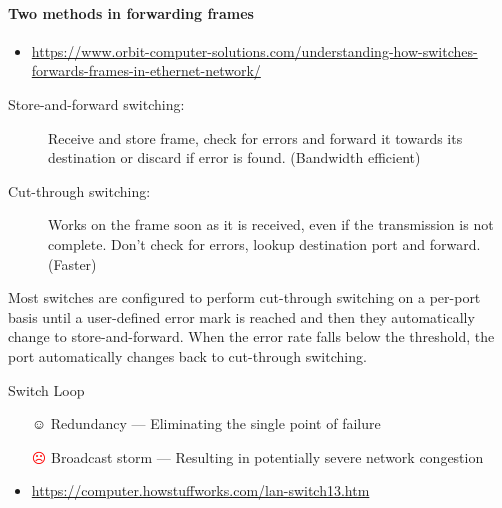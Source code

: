 \paragraph{Two methods in forwarding frames}
\begin{itemize}
\item \url{https://www.orbit-computer-solutions.com/understanding-how-switches-forwards-frames-in-ethernet-network/}
\end{itemize}
\begin{description}
\item[Store-and-forward switching:] Receive and store frame, check for errors and forward
  it towards its destination or discard if error is found. (Bandwidth efficient)
\item[Cut-through switching:] Works on the frame soon as it is received, even if the
  transmission is not complete. Don't check for errors, lookup destination port and
  forward. (Faster)
\end{description}
Most switches are configured to perform cut-through switching on a per-port basis until a
user-defined error mark is reached and then they automatically change to
store-and-forward. When the error rate falls below the threshold, the port automatically
changes back to cut-through switching.

\begin{frame}{Switch Loop}
  \begin{itemize}
  \item[{\Large ☺}] Redundancy --- Eliminating the single point of failure
  \item[{\Large \textcolor{red}{☹}}] Broadcast storm --- Resulting in potentially severe network congestion
  \end{itemize}
  \centering
\end{frame}

\begin{itemize}
\item \url{https://computer.howstuffworks.com/lan-switch13.htm}
\end{itemize}

